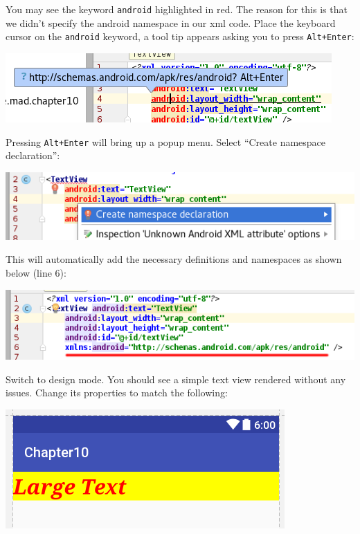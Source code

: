 You may see the keyword \texttt{android} highlighted in red. The reason for this is that we didn't specify the android namespace in our xml code. Place the keyboard cursor on the \texttt{android} keyword, a tool tip appears asking you to press \texttt{Alt+Enter}:

\begin{center}
	\includegraphics[scale=0.4]{chapters/ch10/images/22}
\end{center}

Pressing \texttt{Alt+Enter} will bring up a popup menu. Select ``Create namespace declaration'':

\begin{center}
	\includegraphics[scale=0.4]{chapters/ch10/images/23}
\end{center}

This will automatically add the necessary definitions and namespaces as shown below (line 6):

\begin{center}
	\includegraphics[scale=0.4]{chapters/ch10/images/24}
\end{center}

Switch to design mode. You should see a simple text view rendered without any issues. Change its properties to match the following:

\begin{center}
	\includegraphics[scale=0.4]{chapters/ch10/images/25}
\end{center}

